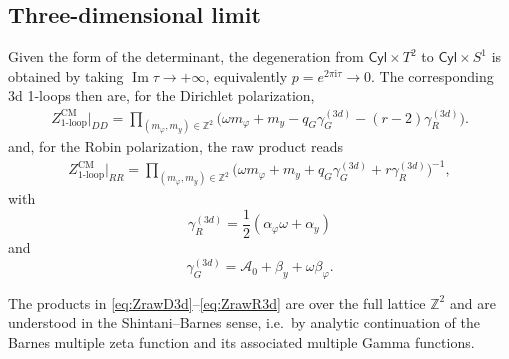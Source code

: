 \documentclass[11pt,a4paper]{article}
\numberwithin{equation}{section}
\theoremstyle{plain}
\theoremstyle{definition}
\theoremstyle{remark}
\newcommand{\ii}{\mathrm{i}}
\newcommand{\cyl}{\mathsf{Cyl}}
\begin{document}
\subsection{Three-dimensional limit}

Given the form of the determinant, the degeneration from $\cyl \times T^2$ to $\cyl \times S^1$ is obtained by taking $\operatorname{Im}\tau\to+\infty$, equivalently $p=e^{2\pi\ii\tau}\to0$. The corresponding 3d 1-loops then are, for the Dirichlet polarization,
\begin{align}
Z^{\mathrm{CM}}_{\mathrm{1\mbox{-}loop}}\big|_{DD}  =
\prod_{(m_\varphi,m_y)\in\mathbb{Z}^2}
\Big(\omega m_\varphi + m_y-q_G\gamma_G^{(3d)}-(r-2)\gamma_R^{(3d)}\Big).
\label{eq:ZrawD3d}
\end{align}
and,  for the Robin polarization,   the raw product reads
\begin{align}
Z^{\mathrm{CM}}_{\mathrm{1\mbox{-}loop}}\big|_{RR} 
 =
\prod_{(m_\varphi,m_y)\in\mathbb{Z}^2}
\Big(\omega m_\varphi + m_y+q_G\gamma_G^{(3d)}+r\gamma_R^{(3d)}\Big)^{-1} ,
\label{eq:ZrawR3d}
\end{align}
with
\begin{equation}
    \gamma_R^{(3d)} = \frac{1}{2}( \alpha_\varphi \omega + \alpha_y )
\end{equation}
and
\begin{equation}
    \gamma_G^{(3d)} = \mathcal A_0 + \beta_y + \omega \beta_\varphi .
\end{equation}

The products in \eqref{eq:ZrawD3d}--\eqref{eq:ZrawR3d} are over the full lattice $\mathbb{Z}^2$ and are understood in the Shintani--Barnes sense, i.e.\ by analytic continuation of the Barnes multiple zeta function and its associated multiple Gamma functions.
\end{document}
